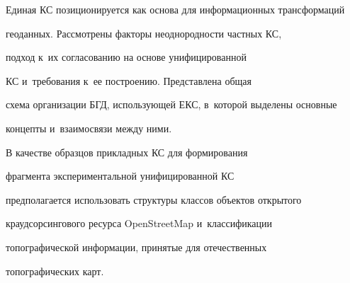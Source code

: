      


  Единая КС позиционируется как основа для информационных трансформаций 


геоданных. Рассмотрены факторы неоднородности частных КС, 


подход к~их согласованию на основе унифицированной 


КС и~требования к~ее построению. Представлена общая 


схема организации БГД, использующей ЕКС, в~которой выделены основные 


концепты и~взаимосвязи между ними.


  


  В качестве образцов прикладных КС для формирования 


фрагмента экспериментальной унифицированной КС 


предполагается использовать структуры классов объектов открытого 


краудсорсингового ресурса OpenStreetMap и~классификации 


топографической информации, принятые для отечественных 


топографических карт.





